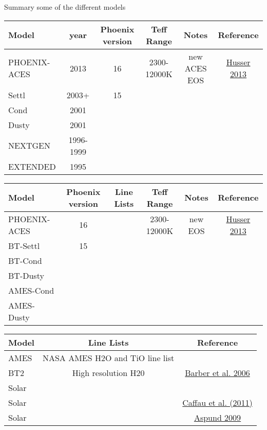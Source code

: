 \documentclass[12pt, a4paper]{article}
\begin{document}
Summary some of the different models

\begin{table}
	\begin{tabular}{lccccc}
		\hline
		Model & year & Phoenix version  & Teff Range &  Notes &Reference\\
		\hline
		PHOENIX-ACES & 2013 & 16 & 2300-12000K & new ACES EOS & \href{https://arxiv.org/abs/1303.5632}{Husser 2013} \\
		
    	Settl & 2003+&15 & & & \href{}{} \\
    	Cond & 2001 & & & & \href{}{} \\
    	Dusty & 2001& & & & \href{}{} \\
        NEXTGEN & 1996-1999& & & \href{}{} \\
        EXTENDED &1995 & & & & \href{}{} \\
    \hline
	\end{tabular}
\end{table}



\begin{table}
    \begin{tabular}{lccccc}
        \hline
        Model & Phoenix version & Line Lists & Teff Range &  Notes &Reference\\
        \hline
        PHOENIX-ACES & 16 & & 2300-12000K & new EOS & \href{https://arxiv.org/abs/1303.5632}{Husser 2013} \\
        
        BT-Settl & 15 & & & & \href{}{} \\
        BT-Cond & & & & & \href{}{} \\
        BT-Dusty & & & & & \href{}{} \\
        AMES-Cond & & & & & \href{}{} \\
        AMES-Dusty & & & & & \href{}{} \\
        \hline
    \end{tabular}
\end{table}


\begin{table}
    \begin{tabular}{lcc}
        \hline
        Model & Line Lists&Reference\\
        \hline
        AMES & NASA AMES H2O and TiO line list&  \href{}{ } \\
        
        BT2& High resolution H20 & \href{}{Barber et al. 2006} \\
        Solar &  & \href{}{} \\
        Solar & & \href{}{Caffau et al. (2011)} \\
        Solar &  & \href{}{Aspund 2009} \\
        
        \hline
    \end{tabular}
\end{table}
\end{document}
